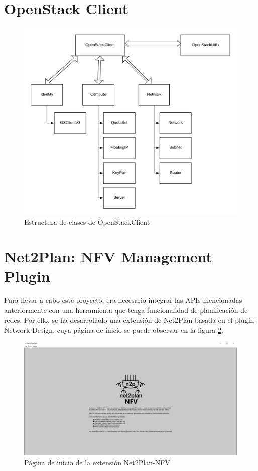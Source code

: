 \section{OpenStack Client}
\label{sec:openstackclient}

\begin{figure}[!ht]
	\centering
	\includegraphics[width=0.7\linewidth]{imagenes/OpenStackClient}
	\caption{Estructura de clases de OpenStackClient}
	\label{fig:openstackclient}
\end{figure}

\section{Net2Plan: NFV Management Plugin}
\label{sec:nfvplugin}

Para llevar a cabo este proyecto, era necesario integrar las APIs mencionadas anteriormente con una herramienta que tenga funcionalidad de planificación de redes. Por ello, se ha desarrollado una extensión de Net2Plan basada en el plugin Network Design, cuya página de inicio se puede observar en la figura \ref{fig:nfvpluginmain}.

\begin{figure}[!ht]
	\centering
	\includegraphics[width=0.8\linewidth]{imagenes/nfvpluginmain}
	\caption{Página de inicio de la extensión Net2Plan-NFV}
	\label{fig:nfvpluginmain}
\end{figure}


